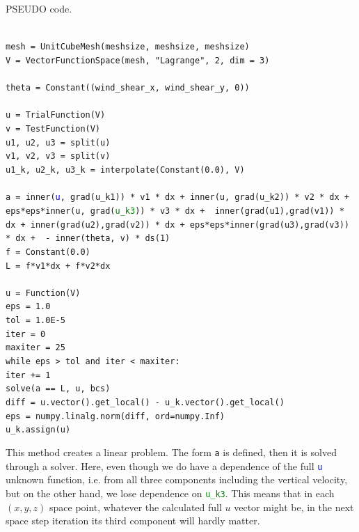 \documentclass[11pt]{article}
\begin{document}
PSEUDO code.

\texttt{
\\
mesh = UnitCubeMesh(meshsize, meshsize, meshsize) \\
V = VectorFunctionSpace(mesh, "Lagrange", 2, dim = 3) \\
\\
theta = Constant((wind\_shear\_x, wind\_shear\_y, 0))\\
\\
u = TrialFunction(V)\\
v = TestFunction(V)\\
u1, u2, u3 = split(u)\\
v1, v2, v3 = split(v)\\
u1\_k, u2\_k, u3\_k = interpolate(Constant(0.0), V) \\
\\
a = inner(\textcolor{blue}{u}, grad(u\_k1)) * v1 * dx + inner(u, grad(u\_k2)) * v2 * dx + eps*eps*inner(u, grad(\textcolor{green}{u\_k3})) * v3 * dx + \
    inner(grad(u1),grad(v1)) * dx + inner(grad(u2),grad(v2)) * dx + eps*eps*inner(grad(u3),grad(v3)) * dx + \
    - inner(theta, v) * ds(1)\\
f = Constant(0.0)\\
L = f*v1*dx + f*v2*dx\\
\\
u = Function(V)\\
eps = 1.0 \\
tol = 1.0E-5 \\
iter = 0\\
maxiter = 25\\
while eps > tol and iter < maxiter:\\
    iter += 1\\
    solve(a == L, u, bcs)\\
    diff = u.vector().get\_local() - u\_k.vector().get\_local()\\
    eps = numpy.linalg.norm(diff, ord=numpy.Inf)\\
    u\_k.assign(u)\\
}

This method creates a linear problem. The form \texttt{a} is defined, then it is solved through a solver. Here, even though we do have a dependence of the full \texttt{\textcolor{blue}{u}} unknown function, i.e. from all three components including the vertical velocity, but on the other hand, we lose dependence on \texttt{\textcolor{green}{u\_k3}}. This means that in each $(x,y,z)$ space point, whatever the calculated full $u$ vector might be, in the next space step iteration its third component will hardly matter.
\end{document}
